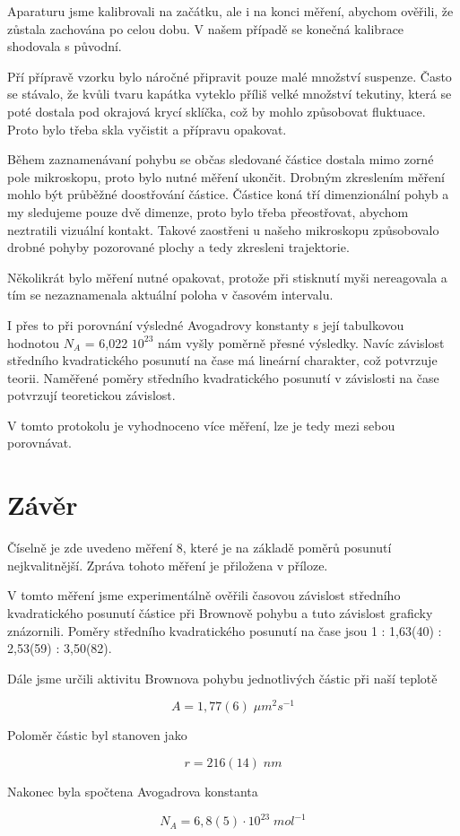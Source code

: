 Aparaturu jsme kalibrovali na začátku, ale i na konci měření, abychom ověřili, že zůstala zachována po celou dobu. V našem případě se konečná kalibrace shodovala s původní.

Pří přípravě vzorku bylo náročné připravit pouze malé množství suspenze. Často se stávalo, že kvůli tvaru kapátka vyteklo příliš velké množství tekutiny, která se poté dostala pod okrajová krycí sklíčka, což by mohlo způsobovat fluktuace. Proto bylo třeba skla vyčistit a přípravu opakovat.

Během zaznamenávaní pohybu se občas sledované částice dostala mimo zorné pole mikroskopu, proto bylo nutné měření ukončit. Drobným zkreslením měření mohlo být průběžné doostřování částice. Částice koná tří dimenzionální pohyb a my sledujeme pouze dvě dimenze, proto bylo třeba přeostřovat, abychom neztratili vizuální kontakt. Takové zaostřeni u našeho mikroskopu způsobovalo drobné pohyby pozorované plochy a tedy zkresleni trajektorie.

Několikrát bylo měření nutné opakovat, protože při stisknutí myši nereagovala a tím se nezaznamenala aktuální poloha v časovém intervalu.

I přes to při porovnání výsledné Avogadrovy konstanty s její tabulkovou hodnotou \(N_A\) = 6,022 \cdot $10^{23}$ nám vyšly poměrně přesné výsledky. Navíc závislost středního kvadratického posunutí na čase má lineární charakter, což potvrzuje teorii. Naměřené poměry středního kvadratického posunutí v závislosti na čase potvrzují teoretickou závislost.

V tomto protokolu je vyhodnoceno více měření, lze je tedy mezi sebou porovnávat.

\section{Závěr}
Číselně je zde uvedeno měření 8, které je na základě poměrů posunutí nejkvalitnější. Zpráva tohoto měření je přiložena v příloze.

V tomto měření jsme experimentálně ověřili časovou závislost středního kvadratického posunutí částice při Brownově pohybu a tuto závislost graficky znázornili. Poměry středního kvadratického posunutí na čase jsou 1 : 1,63(40) : 2,53(59) : 3,50(82).

Dále jsme určili aktivitu Brownova pohybu jednotlivých částic při naší teplotě

\begin{equation}
    \nonumber
    A = 1,77(6) \; \mu m^2 s^{-1}
\end{equation}

Poloměr částic byl stanoven jako

\begin{equation}
    \nonumber
    r = 216(14) \; nm
\end{equation}

Nakonec byla spočtena Avogadrova konstanta

\begin{equation}
    \nonumber
    N_A = 6,8(5) \cdot 10^{23} \; mol^{-1}
\end{equation}
